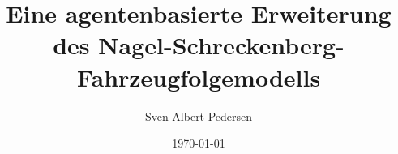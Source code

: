 \documentclass{tucplain}
\title{\textbf{Eine agentenbasierte Erweiterung des Nagel-Schreckenberg-Fahrzeugfolgemodells}}
\author{Sven Albert-Pedersen}
\date{\today}
\begin{document}
    \let\ref\cref
    
    
    \listoftodos
    
    \setcounter{page}{0}
    \setcounter{page}{1}
    
    
    
    
    
    \setcounter{page}{0}
    \setcounter{page}{1}

    
%    
     
%    
    
    
    
    
    
    
    \begin{appendices}
    \renewcommand{\thesection}{\Alph{subsection}}
    
    
%    
%    
	\end{appendices}
\end{document}
